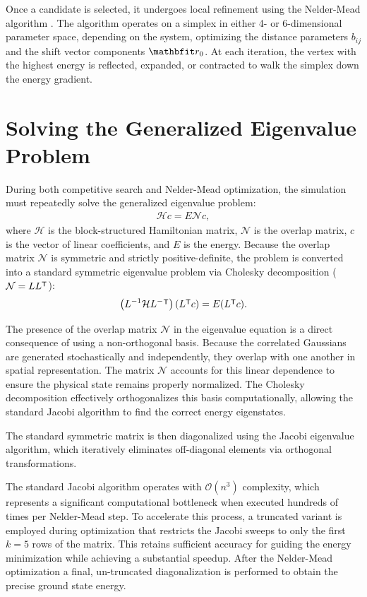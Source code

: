 \documentclass[a4paper,oneside,article,12pt]{memoir}
\begin{document}
Once a candidate is selected, it undergoes local refinement using the Nelder-Mead algorithm \cite{NM}. The algorithm operates on a simplex in either 4- or 6-dimensional parameter space, depending on the system, optimizing the distance parameters $b_{ij}$ and the shift vector components $\v{r_0}$. At each iteration, the vertex with the highest energy is reflected, expanded, or contracted to walk the simplex down the energy gradient. 

\section{Solving the Generalized Eigenvalue Problem} \label{ch:comp_eigenvalue}
During both competitive search and Nelder-Mead optimization, the simulation must repeatedly solve the generalized eigenvalue problem:
\begin{align}
    \mathcal{H}c = E \mathcal{N} c,
\end{align}
where $\mathcal{H}$ is the block-structured Hamiltonian matrix, $\mathcal{N}$ is the overlap matrix, $c$ is the vector of linear coefficients, and $E$ is the energy. Because the overlap matrix $\mathcal{N}$ is symmetric and strictly positive-definite, the problem is converted into a standard symmetric eigenvalue problem via Cholesky decomposition ($\mathcal{N} = L L\tr$):
\begin{align}
    \br{L^{-1} \mathcal{H} L^{-}\tr} (L\tr c) = E (L\tr c).
\end{align}

The presence of the overlap matrix $\mathcal{N}$ in the eigenvalue equation is a direct consequence of using a non-orthogonal basis. Because the correlated Gaussians are generated stochastically and independently, they overlap with one another in spatial representation. The matrix $\mathcal{N}$ accounts for this linear dependence to ensure the physical state remains properly normalized. The Cholesky decomposition effectively orthogonalizes this basis computationally, allowing the standard Jacobi algorithm to find the correct energy eigenstates.

The standard symmetric matrix is then diagonalized using the Jacobi eigenvalue algorithm, which iteratively eliminates off-diagonal elements via orthogonal transformations. 

The standard Jacobi algorithm operates with $\mathcal{O}(n^3)$ complexity, which represents a significant computational bottleneck when executed hundreds of times per Nelder-Mead step. To accelerate this process, a truncated variant is employed during optimization that restricts the Jacobi sweeps to only the first $k=5$ rows of the matrix. This retains sufficient accuracy for guiding the energy minimization while achieving a substantial speedup. After the Nelder-Mead optimization a final, un-truncated diagonalization is performed to obtain the precise ground state energy. 
\end{document}
